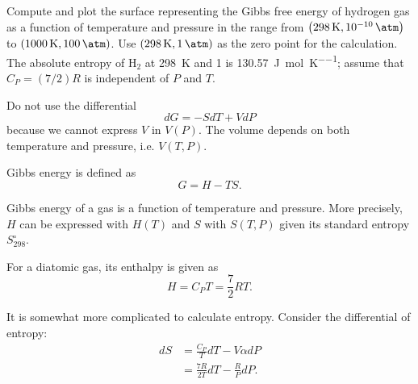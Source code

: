 \begin{@empty}
\begin{problem}
\end{problem}

\begin{problem}
\end{problem}

\begin{problem}
\end{problem}

\begin{problem}
    Compute and plot the surface representing the Gibbs free energy of hydrogen
    gas as a function of temperature and pressure in the range from $\left(
    \SI{298}{\kelvin}, \SI{e-10}{\atm} \right)$ to $\left( \SI{1000}{\kelvin},
    \SI{100}{\atm} \right)$.  Use $\left( \SI{298}{\kelvin}, \SI{1}{\atm}
    \right)$ as the zero point for the calculation.  The absolute entropy of
    H$_2$ at \SI{298}{\kelvin} and \SI{1}{\atm} is
    \SI{130.57}{\joule\per\mol\per\kelvin}; assume that $C_P = (7/2) R$ is
    independent of $P$ and $T$.
\end{problem}

\begin{remark}
    Do not use the differential
    \[ dG = -SdT + VdP \]
    because we cannot express $V$ in $V(P)$.  The volume depends on both
    temperature and pressure, i.e. $V(T, P)$.
\end{remark}

\begin{answer}
    Gibbs energy is defined as
    \begin{equation}
        G = H - TS. \label{eq:4.14.G}
    \end{equation}

    Gibbs energy of a gas is a function of temperature and pressure.  More
    precisely, $H$ can be expressed with $H(T)$ and $S$ with $S(T, P)$ given
    its standard entropy $S_{298}^\circ$.

    For a diatomic gas, its enthalpy is given as
    \begin{equation}
        H = C_P T = \frac72 RT. \label{eq:4.14.H}
    \end{equation}

    It is somewhat more complicated to calculate entropy.  Consider the
    differential of entropy:
    \begin{align*}
        dS &= \frac{C_P}{T} dT - V\alpha dP \\
        &= \frac{7R}{2T} dT - \frac{R}{P} dP.
    \end{align*}


\end{answer}
\end{@empty}
